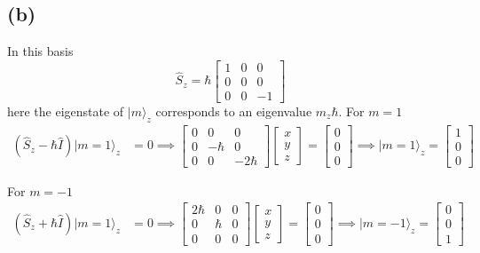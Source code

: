 \documentclass[letter]{article}
\newcommand{\hb}{\hbar}
\begin{document}
\subsection*{(b)} 
In this basis 
\[
\hat{S}_z = 
\hb
\begin{bmatrix} 1 & 0 & 0 \\ 
0 & 0 & 0 \\ 
0 & 0 & -1\end{bmatrix} 
\]
here the eigenstate of $| m \rangle _z$ corresponds to an eigenvalue $m_z \hb$. 
For $ m = 1$ 
\begin{align*} (
	\hat{S}_z - \hb \hat{I} ) 
	| m = 1 \rangle _z &= 0 \implies 
	\begin{bmatrix} 0 & 0 & 0 \\ 0 & -\hb & 0 \\ 0 & 0 & -2 \hb  \end{bmatrix}  
	\begin{bmatrix} x \\ y \\ z \end{bmatrix}  = 
	\begin{bmatrix} 0\\ 0 \\ 0 \end{bmatrix}  \implies 
	| m=1 \rangle _z = \begin{bmatrix} 1 \\ 0 \\ 0 \end{bmatrix}  
\end{align*}


For $ m = -1$ 
\begin{align*} (
	\hat{S}_z + \hb \hat{I} ) 
	| m = 1 \rangle _z &= 0 \implies 
	\begin{bmatrix} 2 \hb  & 0 & 0 \\ 0 & \hb & 0 \\ 0 & 0 & 0   \end{bmatrix}  
	\begin{bmatrix} x \\ y \\ z \end{bmatrix}  = 
	\begin{bmatrix} 0\\ 0 \\ 0 \end{bmatrix}  \implies 
	| m= -1 \rangle _z = \begin{bmatrix} 0 \\ 0 \\ 1 \end{bmatrix}  
\end{align*}
\end{document}
